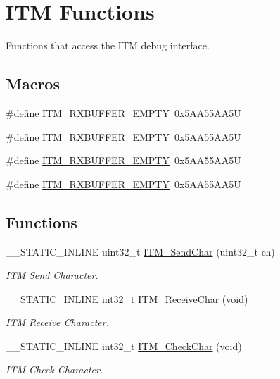 \hypertarget{group___c_m_s_i_s__core___debug_functions}{}\section{I\+TM Functions}
\label{group___c_m_s_i_s__core___debug_functions}


Functions that access the I\+TM debug interface.  


\subsection*{Macros}
\begin{DoxyCompactItemize}
\item 
\#define \mbox{\hyperlink{group___c_m_s_i_s__core___debug_functions_gaa822cb398ee022b59e9e6c5d7bbb228a}{I\+T\+M\+\_\+\+R\+X\+B\+U\+F\+F\+E\+R\+\_\+\+E\+M\+P\+TY}}~0x5\+A\+A55\+A\+A5U
\item 
\#define \mbox{\hyperlink{group___c_m_s_i_s__core___debug_functions_gaa822cb398ee022b59e9e6c5d7bbb228a}{I\+T\+M\+\_\+\+R\+X\+B\+U\+F\+F\+E\+R\+\_\+\+E\+M\+P\+TY}}~0x5\+A\+A55\+A\+A5U
\item 
\#define \mbox{\hyperlink{group___c_m_s_i_s__core___debug_functions_gaa822cb398ee022b59e9e6c5d7bbb228a}{I\+T\+M\+\_\+\+R\+X\+B\+U\+F\+F\+E\+R\+\_\+\+E\+M\+P\+TY}}~0x5\+A\+A55\+A\+A5U
\item 
\#define \mbox{\hyperlink{group___c_m_s_i_s__core___debug_functions_gaa822cb398ee022b59e9e6c5d7bbb228a}{I\+T\+M\+\_\+\+R\+X\+B\+U\+F\+F\+E\+R\+\_\+\+E\+M\+P\+TY}}~0x5\+A\+A55\+A\+A5U
\end{DoxyCompactItemize}
\subsection*{Functions}
\begin{DoxyCompactItemize}
\item 
\+\_\+\+\_\+\+S\+T\+A\+T\+I\+C\+\_\+\+I\+N\+L\+I\+NE uint32\+\_\+t \mbox{\hyperlink{group___c_m_s_i_s__core___debug_functions_gac90a497bd64286b84552c2c553d3419e}{I\+T\+M\+\_\+\+Send\+Char}} (uint32\+\_\+t ch)
\begin{DoxyCompactList}\small\item\em I\+TM Send Character. \end{DoxyCompactList}\item 
\+\_\+\+\_\+\+S\+T\+A\+T\+I\+C\+\_\+\+I\+N\+L\+I\+NE int32\+\_\+t \mbox{\hyperlink{group___c_m_s_i_s__core___debug_functions_gac3ee2c30a1ac4ed34c8a866a17decd53}{I\+T\+M\+\_\+\+Receive\+Char}} (void)
\begin{DoxyCompactList}\small\item\em I\+TM Receive Character. \end{DoxyCompactList}\item 
\+\_\+\+\_\+\+S\+T\+A\+T\+I\+C\+\_\+\+I\+N\+L\+I\+NE int32\+\_\+t \mbox{\hyperlink{group___c_m_s_i_s__core___debug_functions_gae61ce9ca5917735325cd93b0fb21dd29}{I\+T\+M\+\_\+\+Check\+Char}} (void)
\begin{DoxyCompactList}\small\item\em I\+TM Check Character. \end{DoxyCompactList}\end{DoxyCompactItemize}
